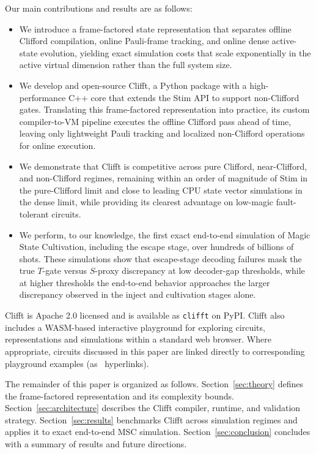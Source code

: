 \documentclass[a4paper, onecolumn, unpublished]{quantumarticle}
\newcommand{\clifftplaydefault}[1]{\href{https://unitaryfoundation.github.io/clifft/playground}{\faPlay}}
\begin{document}
    Our main contributions and results are as follows:
    \begin{itemize}
        \item We introduce a frame-factored state representation that separates offline Clifford compilation, online Pauli-frame tracking, and online dense active-state evolution, yielding exact simulation costs that scale exponentially in the active virtual dimension rather than the full system size.
        \item We develop and open-source Clifft, a Python package with a high-performance C++ core that extends the Stim API to support non-Clifford gates. Translating this frame-factored representation into practice, its custom compiler-to-VM pipeline executes the offline Clifford pass ahead of time, leaving only lightweight Pauli tracking and localized non-Clifford operations for online execution.
        \item We demonstrate that Clifft is competitive across pure Clifford, near-Clifford, and non-Clifford regimes, remaining within an order of magnitude of Stim in the pure-Clifford limit and close to leading CPU state vector simulations in the dense limit, while providing its clearest advantage on low-magic fault-tolerant circuits.
        \item We perform, to our knowledge, the first exact end-to-end simulation of Magic State Cultivation, including the escape stage, over hundreds of billions of shots. These simulations show that escape-stage decoding failures mask the true $T$-gate versus $S$-proxy discrepancy at low decoder-gap thresholds, while at higher thresholds the end-to-end behavior approaches the larger discrepancy observed in the inject and cultivation stages alone.
    \end{itemize}

    Clifft is Apache 2.0 licensed and is available as \texttt{clifft} on PyPI. Clifft also includes a WASM-based interactive playground for exploring circuits, representations and simulations within a standard web browser. Where appropriate, circuits discussed in this paper are linked directly to corresponding playground examples (as \clifftplaydefault\ \ hyperlinks).

   The remainder of this paper is organized as follows. Section~\ref{sec:theory} defines the frame-factored representation and its complexity bounds. Section~\ref{sec:architecture} describes the Clifft compiler, runtime, and validation strategy. Section~\ref{sec:results} benchmarks Clifft across simulation regimes and applies it to exact end-to-end MSC simulation. Section~\ref{sec:conclusion} concludes with a summary of results and future directions.
\end{document}
